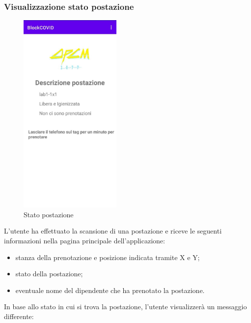 	\subsubsection{Visualizzazione stato postazione}
	\begin{figure}[H]
		\centering
		\includegraphics[width=5cm]{res/images/DescrizionePostazione1.png}
		\caption{Stato postazione}
	\end{figure}
	L'utente ha effettuato la scansione di una postazione e riceve le seguenti informazioni nella pagina principale dell'applicazione:
	\begin{itemize}
		\item stanza della prenotazione e posizione indicata tramite X e Y;
		\item stato della postazione;
		\item eventuale nome del dipendente che ha prenotato la postazione.
	\end{itemize}
	In base allo stato in cui si trova la postazione, l'utente visualizzerà un messaggio differente:
